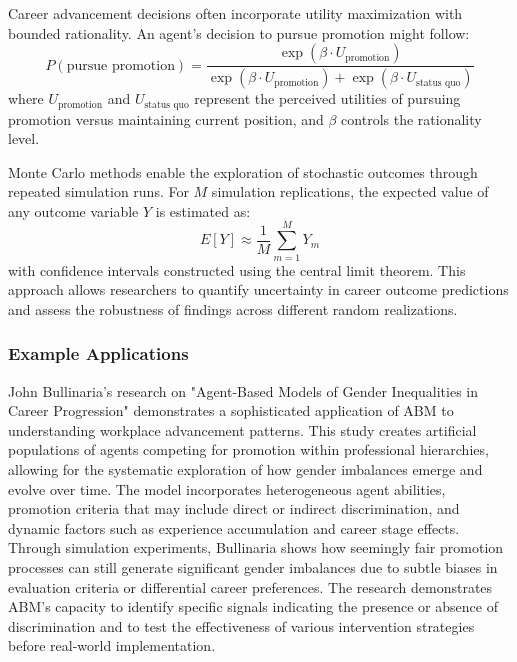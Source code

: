 \documentclass[main.tex]{subfiles}
\begin{document}
Career advancement decisions often incorporate utility maximization with bounded rationality. An agent's decision to pursue promotion might follow:
\[
P(\text{pursue promotion}) = \frac{\exp(\beta \cdot U_{\text{promotion}})}{\exp(\beta \cdot U_{\text{promotion}}) + \exp(\beta \cdot U_{\text{status quo}})}
\]
where $U_{\text{promotion}}$ and $U_{\text{status quo}}$ represent the perceived utilities of pursuing promotion versus maintaining current position, and $\beta$ controls the rationality level\parencite{graduate_attrition}.

Monte Carlo methods enable the exploration of stochastic outcomes through repeated simulation runs. For $M$ simulation replications, the expected value of any outcome variable $Y$ is estimated as:
\[
E[Y] \approx \frac{1}{M} \sum_{m=1}^{M} Y_m
\]
with confidence intervals constructed using the central limit theorem\parencite{wikipedia_abm}. This approach allows researchers to quantify uncertainty in career outcome predictions and assess the robustness of findings across different random realizations.

\subsubsection{Example Applications}

John Bullinaria's research on "Agent-Based Models of Gender Inequalities in Career Progression" demonstrates a sophisticated application of ABM to understanding workplace advancement patterns\parencite{bullinaria_gender,bullinaria_pdf}. This study creates artificial populations of agents competing for promotion within professional hierarchies, allowing for the systematic exploration of how gender imbalances emerge and evolve over time. The model incorporates heterogeneous agent abilities, promotion criteria that may include direct or indirect discrimination, and dynamic factors such as experience accumulation and career stage effects. Through simulation experiments, Bullinaria shows how seemingly fair promotion processes can still generate significant gender imbalances due to subtle biases in evaluation criteria or differential career preferences. The research demonstrates ABM's capacity to identify specific signals indicating the presence or absence of discrimination and to test the effectiveness of various intervention strategies before real-world implementation.
\end{document}
